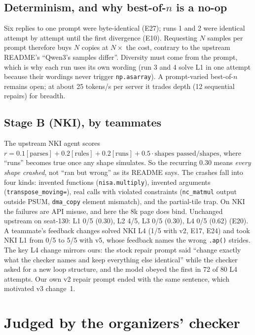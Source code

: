 \documentclass[11pt]{article}
\newcommand{\code}[1]{\texttt{#1}}
\newcommand{\E}[1]{E#1}
\begin{document}
\subsection{\texorpdfstring{Determinism, and why best-of-$n$ is a no-op}{Determinism, and why best-of-n is a no-op}}
Six replies to one prompt were byte-identical (\E{27}); runs 1 and 2 were identical attempt by attempt
until the first divergence (\E{10}). Requesting $N$ samples per prompt therefore buys $N$ copies at
$N\times$ the cost, contrary to the upstream README's ``Qwen3's samples differ''. Diversity must come
from the prompt, which is why each run uses its own wording (run 3 and 4 solve L1 in one attempt because
their wordings never trigger \code{np.asarray}). A prompt-varied best-of-$n$ remains open; at about
25 tokens/s per server it trades depth (12 sequential repairs) for breadth.

\subsection{Stage B (NKI), by teammates}
\label{sec:stageb}
The upstream NKI agent scores $r = 0.1[\text{parses}] + 0.2[\text{rules}] + 0.2[\text{runs}] +
0.5\cdot\text{shapes passed}/\text{shapes}$, where ``runs'' becomes true once any shape simulates. So the
recurring 0.30 means \emph{every shape crashed}, not ``ran but wrong'' as its README says. The crashes
fall into four kinds: invented functions (\code{nisa.multiply}), invented arguments
(\code{transpose\_moving=}), real calls with violated constraints (\code{nc\_matmul} output outside
PSUM, \code{dma\_copy} element mismatch), and the partial-tile trap. On NKI the failures are API misuse,
and here the 8k page does bind. Unchanged upstream on seat-130: L1 0/5 (0.30), L2 4/5, L3 0/5 (0.30),
L4 0/5 (0.62) (\E{20}). A teammate's feedback changes solved NKI L4 (1/5 with v2, \E{17}, \E{24}) and
took NKI L1 from 0/5 to 5/5 with v5, whose feedback names the wrong \code{.ap()} strides. The key L4
change mirrors ours: the stock repair prompt said ``change exactly what the checker names and keep
everything else identical'' while the checker asked for a new loop structure, and the model obeyed the
first in 72 of 80 L4 attempts. Our own v2 repair prompt ended with the same sentence, which motivated
v3 change~1.

\section{Judged by the organizers' checker}
\label{sec:kb}
\end{document}
